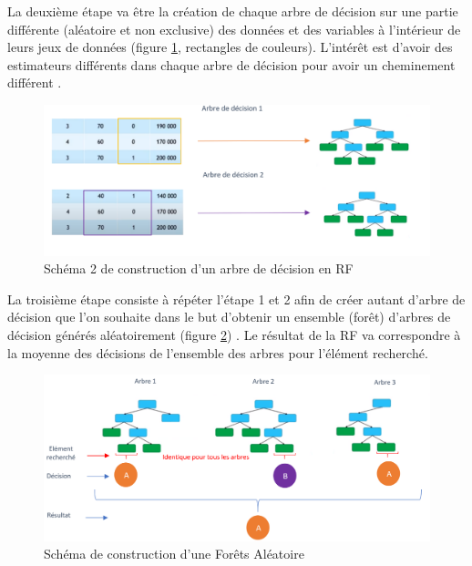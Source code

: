 \documentclass[
  11pt,
  french,
  a4paper,
  extrafontsizes,onecolumn,openright
  ]{memoir}
\begin{document}
\normalsize

\vfill
\newpage

La deuxième étape va être la création de chaque arbre de décision sur une partie différente (aléatoire et non exclusive) des données et des variables à l'intérieur de leurs jeux de données (figure \ref{fig:12}, rectangles de couleurs). L'intérêt est d'avoir des estimateurs différents dans chaque arbre de décision pour avoir un cheminement différent \autocite{moutarde_arbres_2017}.

\scriptsize

\begin{figure}

{\centering \includegraphics[width=0.8\linewidth]{Images/Figure12} 

}

\caption{Schéma 2 de construction d’un arbre de décision en RF}\label{fig:12}
\end{figure}

\normalsize

La troisième étape consiste à répéter l'étape 1 et 2 afin de créer autant d'arbre de décision que l'on souhaite dans le but d'obtenir un ensemble (forêt) d'arbres de décision générés aléatoirement (figure \ref{fig:13}) \autocite{moutarde_arbres_2017}.
Le résultat de la RF va correspondre à la moyenne des décisions de l'ensemble des arbres pour l'élément recherché.

\scriptsize

\begin{figure}

{\centering \includegraphics[width=0.8\linewidth]{Images/Figure13} 

}

\caption{Schéma de construction d’une Forêts Aléatoire}\label{fig:13}
\end{figure}
\end{document}
